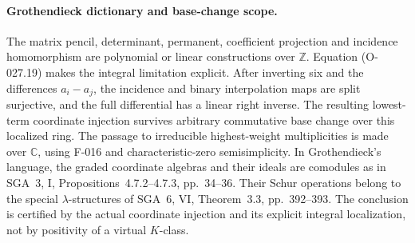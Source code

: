 \paragraph{Grothendieck dictionary and base-change scope.}
The matrix pencil, determinant, permanent, coefficient
projection and incidence homomorphism are polynomial or
linear constructions over \(\mathbb Z\).
Equation (O-027.19) makes the integral limitation explicit.
After inverting six and the differences \(a_i-a_j\),
the incidence and binary interpolation maps are split
surjective, and the full differential has a linear
right inverse. The resulting lowest-term coordinate
injection survives arbitrary commutative base change
over this localized ring.
The passage to irreducible highest-weight multiplicities
is made over \(\mathbb C\), using F-016 and
characteristic-zero semisimplicity.
In Grothendieck's language, the graded coordinate algebras
and their ideals are comodules as in SGA~3, I,
Propositions~4.7.2--4.7.3, pp.~34--36.
Their Schur operations belong to the special
\(\lambda\)-structures of SGA~6, VI, Theorem~3.3,
pp.~392--393. The conclusion is certified by the actual
coordinate injection and its explicit integral localization,
not by positivity of a virtual \(K\)-class.
